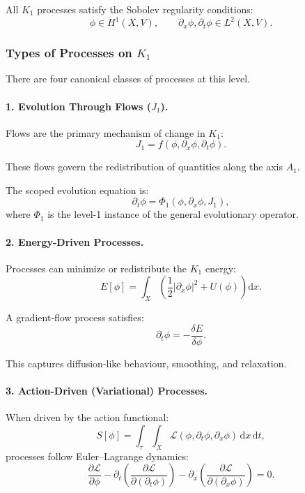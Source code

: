 All $K_1$ processes satisfy the Sobolev regularity conditions:
\[
\phi \in H^1(X,V),
\qquad
\partial_x \phi, \partial_t \phi \in L^2(X,V).
\]

\subsubsection{Types of Processes on \texorpdfstring{$K_1$}{K_1}}

There are four canonical classes of processes at this level.

\paragraph{1. Evolution Through Flows (\texorpdfstring{$J_1$}{J_1}).}

Flows are the primary mechanism of change in $K_1$:
\[
J_1 = f(\phi, \partial_x\phi, \partial_t\phi).
\]

These flows govern the redistribution of quantities along the axis $A_1$.

The scoped evolution equation is:
\[
\partial_t \phi = \Phi_1(\phi, \partial_x \phi, J_1),
\]
where $\Phi_1$ is the level-1 instance of the general evolutionary operator.

\paragraph{2. Energy-Driven Processes.}

Processes can minimize or redistribute the $K_1$ energy:
\[
E[\phi] = \int_X \left( 
\frac{1}{2} |\partial_x \phi|^2 + U(\phi)
\right) \mathrm{d}x.
\]

A gradient-flow process satisfies:
\[
\partial_t \phi = - \frac{\delta E}{\delta \phi}.
\]

This captures diffusion-like behaviour, smoothing, and relaxation.

\paragraph{3. Action-Driven (Variational) Processes.}

When driven by the action functional:
\[
S[\phi] = \int_{\tau} \int_X
\mathcal{L}(\phi, \partial_t\phi, \partial_x\phi) \, \mathrm{d}x \, \mathrm{d}t,
\]
processes follow Euler–Lagrange dynamics:
\[
\frac{\partial \mathcal{L}}{\partial \phi}
- \partial_t \left( \frac{\partial \mathcal{L}}{\partial(\partial_t \phi)} \right)
- \partial_x \left( \frac{\partial \mathcal{L}}{\partial(\partial_x \phi)} \right)
= 0.
\]

